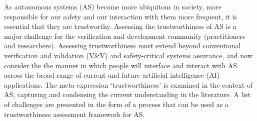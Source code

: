 As autonomous systems (AS) become more ubiquitous in society, more responsible for our safety and our interaction with them more frequent, it is essential that they are trustworthy. Assessing the trustworthiness of AS is a major challenge for the verification and development community (practitioners and researchers). Assessing trustworthiness must extend beyond conventional verification and validation (V\&V) and safety-critical systems assurance, and now consider the the manner in which people will  
interface %
and 
interact %
with AS across the broad range of current and future artificial intelligence (AI) applications. 
%
The meta-expression `trustworthiness' is examined in the context of AS, capturing and condensing the current understanding in the literature. 
%
A list of challenges are presented in the form of a process that can be used as a trustworthiness assessment framework for AS. 
